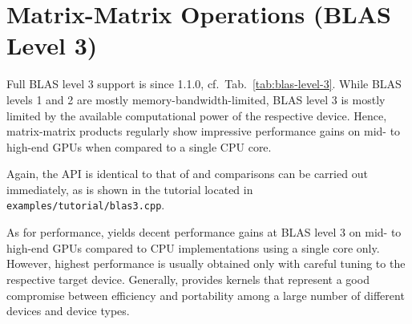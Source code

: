\section{Matrix-Matrix Operations (BLAS Level 3)}
Full BLAS level 3 support is since {\ViennaCL} 1.1.0, cf.~Tab.~\ref{tab:blas-level-3}. While BLAS
levels 1 and 2 are mostly memory-bandwidth-limited, BLAS level 3 is mostly
limited by the available computational power of the respective device. Hence,
matrix-matrix products regularly show impressive performance gains on mid-
to high-end GPUs when compared to a single CPU core.

Again, the {\ViennaCL} API is identical to that of {\ublas} and comparisons can
be carried out immediately, as is shown in the tutorial located in
\texttt{examples/tutorial/blas3.cpp}.

As for performance, {\ViennaCL} yields decent performance gains at BLAS level
3 on mid- to high-end GPUs compared to CPU implementations using a single core
only. However, highest performance is usually obtained only with careful tuning to the respective target device.
Generally, {\ViennaCL} provides
kernels that represent a good compromise between efficiency and portability
among a large number of different devices and device types.




